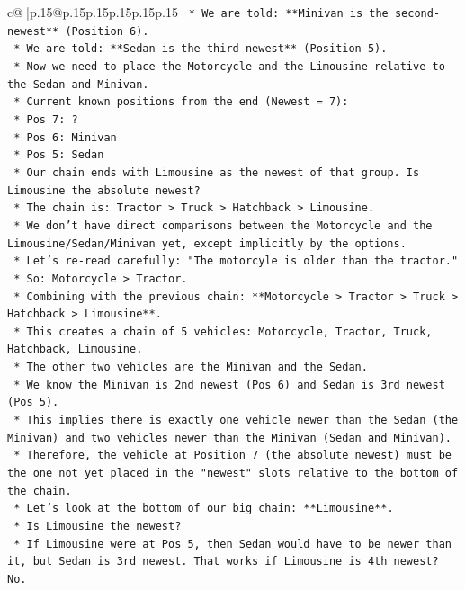 \documentclass{article}
\begin{document}
{\begin{supertabular}{c@{$\;$}|p{.15\linewidth}@{}p{.15\linewidth}p{.15\linewidth}p{.15\linewidth}p{.15\linewidth}p{.15\linewidth}}
{{{\texttt{        *   We are told: **Minivan is the second{-}newest** (Position 6).} \\
\texttt{        *   We are told: **Sedan is the third{-}newest** (Position 5).} \\
\texttt{    *   Now we need to place the Motorcycle and the Limousine relative to the Sedan and Minivan.} \\
\texttt{    *   Current known positions from the end (Newest = 7):} \\
\texttt{        *   Pos 7: ?} \\
\texttt{        *   Pos 6: Minivan} \\
\texttt{        *   Pos 5: Sedan} \\
\texttt{    *   Our chain ends with Limousine as the newest of that group. Is Limousine the absolute newest?} \\
\texttt{        *   The chain is: Tractor > Truck > Hatchback > Limousine.} \\
\texttt{        *   We don't have direct comparisons between the Motorcycle and the Limousine/Sedan/Minivan yet, except implicitly by the options.} \\
\texttt{        *   Let's re{-}read carefully: "The motorcyle is older than the tractor."} \\
\texttt{        *   So: Motorcycle > Tractor.} \\
\texttt{        *   Combining with the previous chain: **Motorcycle > Tractor > Truck > Hatchback > Limousine**.} \\
\texttt{    *   This creates a chain of 5 vehicles: Motorcycle, Tractor, Truck, Hatchback, Limousine.} \\
\texttt{    *   The other two vehicles are the Minivan and the Sedan.} \\
\texttt{    *   We know the Minivan is 2nd newest (Pos 6) and Sedan is 3rd newest (Pos 5).} \\
\texttt{    *   This implies there is exactly one vehicle newer than the Sedan (the Minivan) and two vehicles newer than the Minivan (Sedan and Minivan).} \\
\texttt{    *   Therefore, the vehicle at Position 7 (the absolute newest) must be the one not yet placed in the "newest" slots relative to the bottom of the chain.} \\
\texttt{    *   Let's look at the bottom of our big chain: **Limousine**.} \\
\texttt{    *   Is Limousine the newest?} \\
\texttt{        *   If Limousine were at Pos 5, then Sedan would have to be newer than it, but Sedan is 3rd newest. That works if Limousine is 4th newest? No.} \\
}}}
\end{supertabular}}
\end{document}
